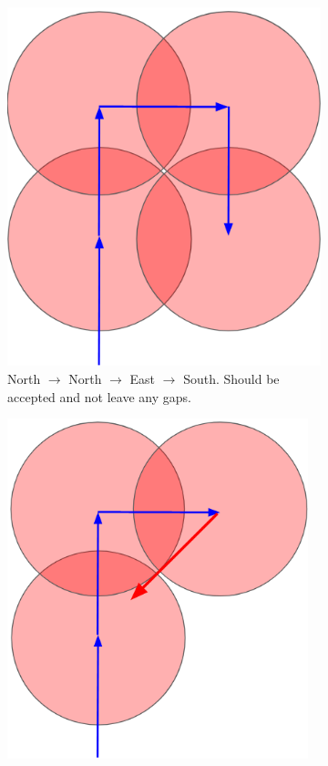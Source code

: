 \begin{figure}
\centering
    \begin{subfigure}{0.3\textwidth}
    \centering
    \includegraphics[width=\textwidth]{figures/threshold_a.png}
    \caption{North $\rightarrow$ North $\rightarrow$ East $\rightarrow$ South. Should be accepted and not leave any gaps.}
    \label{fig:threshold_a}
    \end{subfigure}
    \begin{subfigure}{0.3\textwidth}
    \centering
    \includegraphics[width=0.96\textwidth]{figures/threshold_b.png}

\end{subfigure}
\end{figure}
